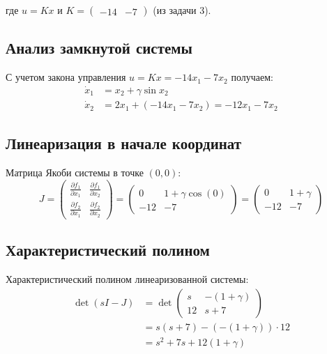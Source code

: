где $u = Kx$ и $K = \begin{pmatrix} -14 & -7 \end{pmatrix}$ (из задачи 3).

\subsection{Анализ замкнутой системы}

С учетом закона управления $u = Kx = -14x_1 - 7x_2$ получаем:
\begin{align}
\dot{x}_1 &= x_2 + \gamma \sin x_2 \\
\dot{x}_2 &= 2x_1 + (-14x_1 - 7x_2) = -12x_1 - 7x_2
\end{align}

\subsection{Линеаризация в начале координат}

Матрица Якоби системы в точке $(0,0)$:
\begin{equation}
J = \begin{pmatrix} 
\frac{\partial f_1}{\partial x_1} & \frac{\partial f_1}{\partial x_2} \\
\frac{\partial f_2}{\partial x_1} & \frac{\partial f_2}{\partial x_2}
\end{pmatrix} = \begin{pmatrix} 
0 & 1 + \gamma \cos(0) \\
-12 & -7
\end{pmatrix} = \begin{pmatrix} 
0 & 1 + \gamma \\
-12 & -7
\end{pmatrix}
\end{equation}

\subsection{Характеристический полином}

Характеристический полином линеаризованной системы:
\begin{align}
\det(sI - J) &= \det\begin{pmatrix} s & -(1+\gamma) \\ 12 & s+7 \end{pmatrix} \\
&= s(s+7) - (-(1+\gamma)) \cdot 12 \\
&= s^2 + 7s + 12(1+\gamma)
\end{align}


